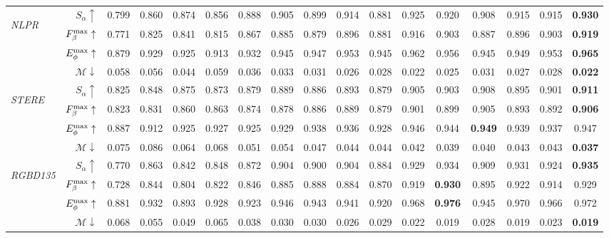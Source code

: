 \documentclass[letterpaper]{article}
\begin{document}
\begin{table*}[t!]
\begin{tabular}{lr|cccccccccccccc||c}
		\midrule
		\multirow{4}{*}{\begin{sideways}\textit{NLPR}\end{sideways}}
& $S_{\alpha}\uparrow$ & 0.799 & 0.860 & 0.874 & 0.856 &0.888 & 0.905 & 0.899 &0.914 &0.881 &0.925 &0.920 &0.908 &0.915 &0.915  &\bf{0.930} \\
		& $F_{\beta}^{\rm max}\uparrow$    & 0.771 & 0.825 & 0.841 & 0.815 &0.867 & 0.885 & 0.879 &0.896 &0.881 &0.916 &0.903 &0.887 &0.896  &0.903  &\bf{0.919} \\
		& $E_{\phi}^{\rm max}\uparrow$  & 0.879 & 0.929 & 0.925 & 0.913 &0.932 & 0.945 & 0.947 &0.953 &0.945 & 0.962 &0.956 &0.945 &0.949 &0.953 &\bf {0.965} \\
		& $\mathcal{M}\downarrow$ & 0.058 & 0.056 & 0.044 & 0.059 & 0.036 & 0.033 & 0.031 &0.026 &0.028 & 0.022 &0.025 &0.031 &0.027  &0.028 &\bf{0.022}  \\
		\midrule
		\multirow{4}{*}{\begin{sideways}\textit{STERE}\end{sideways}}
& $S_{\alpha}\uparrow$& 0.825 & 0.848 & 0.875 & 0.873  & 0.879 & 0.889 & 0.886 &0.893  &0.879 &0.905 &0.903 &0.908 &0.895  &0.901  &\bf{0.911} \\
		& $F_{\beta}^{\rm max}\uparrow$   & 0.823 & 0.831 & 0.860 & 0.863  & 0.874 & 0.878 & 0.886 &0.889  &0.879 &0.901 &0.899 &0.905 &0.893 &0.892  &\bf{0.906} \\
		& $E_{\phi}^{\rm max}\uparrow$ & 0.887 & 0.912 & 0.925 & 0.927  & 0.925 & 0.929 & 0.938 &0.936 &0.928 &0.946 &0.944 &\bf{0.949} &0.939 &0.937  &0.947 \\
		& $\mathcal{M}\downarrow$   & 0.075 & 0.086 & 0.064 & 0.068  & 0.051 & 0.054 & 0.047 &0.044  &0.044 &0.042 &0.039 &0.040 &0.043  &0.043  &\bf{0.037} \\
		\midrule
		\multirow{4}{*}{\begin{sideways}\textit{RGBD135}\end{sideways}}
& $S_{\alpha}\uparrow$ & 0.770 & 0.863 & 0.842 & 0.848  & 0.872 & 0.904 & 0.900 &0.904 &0.884 &0.929 &0.934 &0.909 &0.931 &0.924 &\bf{0.935}  \\
		& $F_{\beta}^{\rm max}\uparrow$  & 0.728 & 0.844 & 0.804 & 0.822  & 0.846 & 0.885 & 0.888 &0.884 &0.870 & 0.919 &\bf{0.930} &0.895 &0.922  &0.914  &0.929  \\
		& $E_{\phi}^{\rm max}\uparrow$ & 0.881 & 0.932 & 0.893 & 0.928  & 0.923 & 0.946 & 0.943 &0.941 &0.920 &0.968 &\bf{0.976} &0.945 &0.970  &0.966  &0.972 \\
		& $\mathcal{M}\downarrow$ & 0.068 & 0.055 & 0.049 & 0.065  & 0.038 & 0.030 & 0.030 &0.026 &0.029 & 0.022 &0.019 &0.028 &0.019 &0.023  &\bf{0.019} \\

\end{tabular}
\end{table*}
\end{document}
